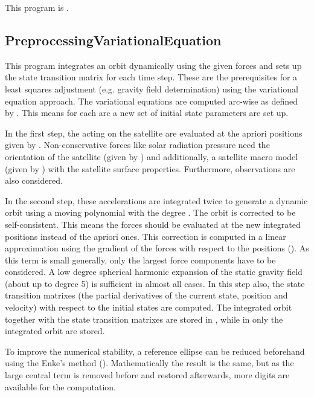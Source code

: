 This program is .
\clearpage
\subsection{PreprocessingVariationalEquation}\label{PreprocessingVariationalEquation}
This program integrates an orbit dynamically using the given forces and sets up the state transition matrix
for each time step. These are the prerequisites for a least squares adjustment (e.g. gravity field determination) using
the variational equation approach. The variational equations are computed arc-wise as defined by .
This means for each arc a new set of initial state parameters are set up.

In the first step, the  acting on the satellite are evaluated at the apriori positions given
by . Non-conservative forces like solar radiation pressure need the orientation of the
satellite (given by ) and additionally, a satellite macro model (given by )
with the satellite surface properties. Furthermore,  observations are also considered.

In the second step, these accelerations are integrated twice to generate a dynamic orbit using a moving polynomial with the degree
. The orbit is corrected to be self-consistent. This means the forces should be evaluated
at the new integrated positions instead of the apriori ones. This correction is computed in a linear approximation
using the gradient of the forces with respect to the positions (). As this term is small generally,
only the largest force components have to be considered. A low degree spherical harmonic expansion of the static gravity
field (about up to degree 5) is sufficient in almost all cases. In this step also, the state transition matrixes (the partial
derivatives of the current state, position and velocity) with respect to the initial states are computed.
The integrated orbit together with the state transition matrixes are stored in ,
while in  only the integrated orbit are stored.

To improve the numerical stability, a reference ellipse can be reduced beforehand using the Enke's method ().
Mathematically the result is the same, but as the large central term is removed before and restored
afterwards, more digits are available for the computation.

